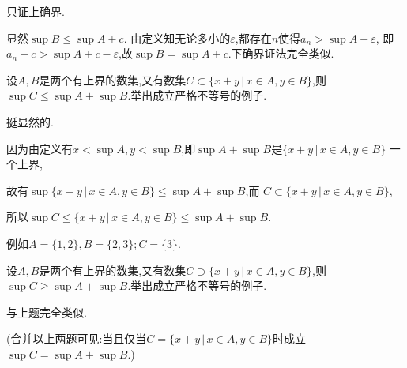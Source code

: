 \documentclass[windows,list,answers]{BHCexam}
\begin{document}
\begin{questions}
    \begin{solution}{1cm}
        \methodonly
        只证上确界.

        显然$\sup B\leqslant\sup A+c$.
        由定义知无论多小的$\varepsilon$,都存在$n$使得$a_n>\sup A-\varepsilon$,
        即$a_n+c>\sup A+c-\varepsilon$,故$\sup B=\sup A+c$.下确界证法完全类似.
    \end{solution}

    \question
    设$A,B$是两个有上界的数集,又有数集$C\subset \{x+y\,\lvert\, x\in A,y\in B\}$,则
    $\sup C\leqslant \sup A+\sup B$.举出成立严格不等号的例子.
    \begin{solution}{1cm}
        \methodonly
        挺显然的.

        因为由定义有$x<\sup A,y<\sup B$,即$\sup A+\sup B$是$\{x+y\,\lvert\,x\in A,y\in B\}$
        一个上界,
        
        故有$\sup \{x+y\,\lvert\,x\in A,y\in B\}\leqslant\sup A+\sup B$,而
        $C\subset \{x+y\,\lvert\,x\in A,y\in B\}$,
        
        所以$\sup C\leqslant \{x+y\,\lvert\,x\in A,y\in B\}\leqslant\sup A+\sup B$.

        例如$A=\{1,2\},B=\{2,3\};C=\{3\}$.
    \end{solution}

    \question
    设$A,B$是两个有上界的数集,又有数集$C\supset  \{x+y\,\lvert\, x\in A,y\in B\}$,则
    $\sup C\geqslant \sup A+\sup B$.举出成立严格不等号的例子.
    \begin{solution}{1cm}
        \methodonly
        与上题完全类似.
    \end{solution}
    (合并以上两题可见:当且仅当$C=\{x+y\,\lvert\, x\in A,y\in B\}$时成立$\sup C=\sup A+\sup B$.)

\end{questions}
\end{document}
